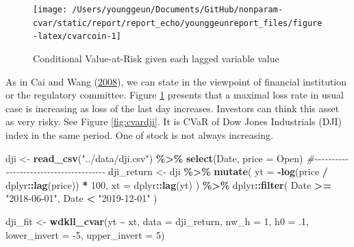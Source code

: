 \documentclass[
]{article}
\newenvironment{Shaded}{\begin{snugshade}}{\end{snugshade}}
\newcommand{\CommentTok}[1]{\textcolor[rgb]{0.56,0.35,0.01}{\textit{#1}}}
\newcommand{\DataTypeTok}[1]{\textcolor[rgb]{0.13,0.29,0.53}{#1}}
\newcommand{\DecValTok}[1]{\textcolor[rgb]{0.00,0.00,0.81}{#1}}
\newcommand{\FloatTok}[1]{\textcolor[rgb]{0.00,0.00,0.81}{#1}}
\newcommand{\KeywordTok}[1]{\textcolor[rgb]{0.13,0.29,0.53}{\textbf{#1}}}
\newcommand{\NormalTok}[1]{#1}
\newcommand{\OperatorTok}[1]{\textcolor[rgb]{0.81,0.36,0.00}{\textbf{#1}}}
\newcommand{\StringTok}[1]{\textcolor[rgb]{0.31,0.60,0.02}{#1}}
\theoremstyle{definition}
\theoremstyle{definition}
\theoremstyle{definition}
\theoremstyle{remark}
\begin{document}
\begin{figure}[H]

{\centering \texttt{[image: /Users/younggeun/Documents/GitHub/nonparam-cvar/static/report/report\_echo/younggeunreport\_files/figure-latex/cvarcoin-1]} 

}

\caption{Conditional Value-at-Risk given each lagged variable value}\label{fig:cvarcoin}
\end{figure}

As in Cai and Wang (\protect\hyperlink{ref-cai:2008aa}{2008}), we can state in the viewpoint of financial institution or the regulatory committee. Figure \ref{fig:cvarcoin} presents that a maximal loss rate in usual case is increasing as loss of the last day increases. Investors can think this asset as very risky. See Figure \ref{fig:cvardji}. It is CVaR of Dow Jones Industrials (DJI) index in the same period. One of stock is not always increasing.

\begin{Shaded}
\begin{Highlighting}[]
\NormalTok{dji <{-}}
\StringTok{  }\KeywordTok{read\_csv}\NormalTok{(}\StringTok{"../data/dji.csv"}\NormalTok{) }\OperatorTok{\%>\%}
\StringTok{  }\KeywordTok{select}\NormalTok{(Date, }\DataTypeTok{price =}\NormalTok{ Open)}
\CommentTok{\#{-}{-}{-}{-}{-}{-}{-}{-}{-}{-}{-}{-}{-}{-}{-}{-}{-}{-}{-}{-}{-}{-}{-}{-}{-}{-}{-}{-}{-}{-}{-}{-}{-}{-}{-}{-}{-}{-}{-}}
\NormalTok{dji\_return <{-}}\StringTok{ }
\StringTok{  }\NormalTok{dji }\OperatorTok{\%>\%}\StringTok{ }
\StringTok{  }\KeywordTok{mutate}\NormalTok{(}
    \DataTypeTok{yt =} \OperatorTok{{-}}\KeywordTok{log}\NormalTok{(price }\OperatorTok{/}\StringTok{ }\NormalTok{dplyr}\OperatorTok{::}\KeywordTok{lag}\NormalTok{(price)) }\OperatorTok{*}\StringTok{ }\DecValTok{100}\NormalTok{,}
    \DataTypeTok{xt =}\NormalTok{ dplyr}\OperatorTok{::}\KeywordTok{lag}\NormalTok{(yt)}
\NormalTok{  ) }\OperatorTok{\%>\%}\StringTok{ }
\StringTok{  }\NormalTok{dplyr}\OperatorTok{::}\KeywordTok{filter}\NormalTok{(}
\NormalTok{    Date }\OperatorTok{>=}\StringTok{ "2018{-}06{-}01"}\NormalTok{,}
\NormalTok{    Date }\OperatorTok{<}\StringTok{ "2019{-}12{-}01"}
\NormalTok{  )}
\end{Highlighting}
\end{Shaded}

\begin{Shaded}
\begin{Highlighting}[]
\NormalTok{dji\_fit <{-}}\StringTok{ }\KeywordTok{wdkll\_cvar}\NormalTok{(yt }\OperatorTok{\textasciitilde{}}\StringTok{ }\NormalTok{xt, }\DataTypeTok{data =}\NormalTok{ dji\_return, }\DataTypeTok{nw\_h =} \DecValTok{1}\NormalTok{, }\DataTypeTok{h0 =} \FloatTok{.1}\NormalTok{, }\DataTypeTok{lower\_invert =} \DecValTok{{-}5}\NormalTok{, }\DataTypeTok{upper\_invert =} \DecValTok{5}\NormalTok{)}
\end{Highlighting}
\end{Shaded}
\end{document}
